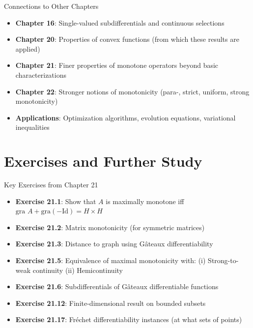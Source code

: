\documentclass[aspectratio=169,10pt]{beamer}
\begin{document}
\begin{frame}{Connections to Other Chapters}
    \begin{itemize}
        \item \textbf{Chapter 16}: Single-valued subdifferentials and continuous selections

        \item \textbf{Chapter 20}: Properties of convex functions (from which these results are applied)

        \item \textbf{Chapter 21}: Finer properties of monotone operators beyond basic characterizations

        \item \textbf{Chapter 22}: Stronger notions of monotonicity
              (para-, strict, uniform, strong monotonicity)

        \item \textbf{Applications}: Optimization algorithms, evolution equations, variational inequalities
    \end{itemize}
\end{frame}

\section{Exercises and Further Study}

\begin{frame}{Key Exercises from Chapter 21}
    \begin{itemize}
        \item \textbf{Exercise 21.1}: Show that $A$ is maximally monotone iff $\text{gra } A + \text{gra}(-\text{Id}) = H \times H$

        \item \textbf{Exercise 21.2}: Matrix monotonicity (for symmetric matrices)

        \item \textbf{Exercise 21.3}: Distance to graph using Gâteaux differentiability

        \item \textbf{Exercise 21.5}: Equivalence of maximal monotonicity with:
              (i) Strong-to-weak continuity
              (ii) Hemicontinuity

        \item \textbf{Exercise 21.6}: Subdifferentials of Gâteaux differentiable functions

        \item \textbf{Exercise 21.12}: Finite-dimensional result on bounded subsets

        \item \textbf{Exercise 21.17}: Fréchet differentiability instances (at what sets of points)
    \end{itemize}
\end{frame}
\end{document}
